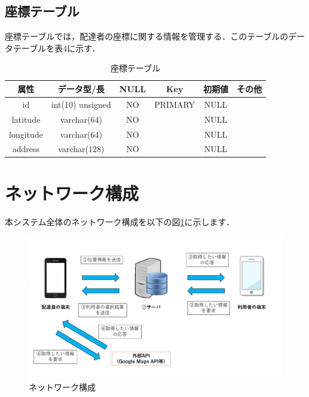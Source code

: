 \documentclass[a4j,titlepage]{jarticle}
\begin{document}
\subsection{座標テーブル}
座標テーブルでは，配達者の座標に関する情報を管理する．このテーブルのデータテーブルを表4に示す．
\begin{table}[htbp]
\begin{center}
 \caption{座標テーブル}
  \begin{tabular}{|c|c|c|c|c|c|}\hline
    属性 & データ型/長 & NULL & Key & 初期値 & その他\\ \hline \hline
    id & int(10) unsigned & NO & PRIMARY & NULL & \\ \hline
    latitude & varchar(64) & NO &  & NULL & \\ \hline
    longitude & varchar(64) & NO &  & NULL & \\ \hline
		address & varchar(128) & NO &  & NULL & \\ \hline
  \end{tabular}
\end{center}
\end{table}

\section{ネットワーク構成}
本システム全体のネットワーク構成を以下の図\ref{fig:i_f}に示します．

\begin{figure}[htbp]
 \begin{center}
  \includegraphics[width=140mm]{information_flow.pdf}
	\caption{ネットワーク構成}
	\label{fig:i_f}
 \end{center}

\end{figure}
\end{document}
